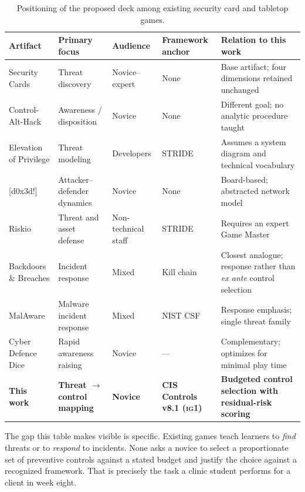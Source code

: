 \documentclass[10pt,twocolumn,letterpaper]{article}
\newcommand{\ig}[1]{\textsc{ig#1}}
\begin{document}
\begin{table}[t]
\centering
\caption{Positioning of the proposed deck among existing security card and tabletop games.}
\label{tab:related}
\small
\begin{tabularx}{\textwidth}{@{}l l l l X@{}}
\toprule
\textbf{Artifact} & \textbf{Primary focus} & \textbf{Audience} &
\textbf{Framework anchor} & \textbf{Relation to this work} \\
\midrule
Security Cards \cite{denning2013securitycards} & Threat discovery & Novice--expert & None &
Base artifact; four dimensions retained unchanged \\
Control-Alt-Hack \cite{denning2013controlalthack} & Awareness / disposition & Novice & None &
Different goal; no analytic procedure taught \\
Elevation of Privilege \cite{shostack2014eop} & Threat modeling & Developers & STRIDE &
Assumes a system diagram and technical vocabulary \\
{[d0x3d!]} \cite{gondree2013d0x3d} & Attacker--defender dynamics & Novice & None &
Board-based; abstracted network model \\
Riskio \cite{hart2020riskio} & Threat and asset defense & Non-technical staff & STRIDE &
Requires an expert Game Master \\
Backdoors \& Breaches \cite{bhis2019backdoors} & Incident response & Mixed & Kill chain &
Closest analogue; response rather than \emph{ex ante} control selection \\
MalAware \cite{malaware2024} & Malware incident response & Mixed & NIST CSF &
Response emphasis; single threat family \\
Cyber Defence Dice \cite{cyberdefencedice2026} & Rapid awareness raising & Novice & --- &
Complementary; optimizes for minimal play time \\
\midrule
\textbf{This work} & \textbf{Threat $\rightarrow$ control mapping} & \textbf{Novice} &
\textbf{CIS Controls v8.1 (\ig{1})} &
\textbf{Budgeted control selection with residual-risk scoring} \\
\bottomrule
\end{tabularx}
\end{table}

The gap this table makes visible is specific. Existing games teach learners to
\emph{find} threats or to \emph{respond} to incidents. None asks a novice to
select a proportionate set of preventive controls against a stated budget and
justify the choice against a recognized framework. That is precisely the task a
clinic student performs for a client in week eight.
\end{document}
